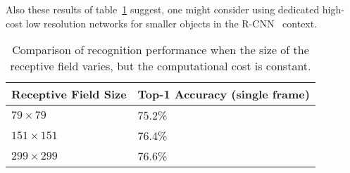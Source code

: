 \documentclass[10pt,twocolumn,letterpaper]{article}
\begin{document}
Also these results of table~\ref{lowrescmp} suggest, one might consider using
dedicated high-cost low resolution networks for smaller objects in the
R-CNN~\cite{girshick2014rcnn} context.

\begin{table}
{
 \begin{center}
   \begin{tabular}[H]{|l|l|}
   \hline
   {\bf Receptive Field Size} & {\bf Top-1 Accuracy (single frame)}\\
   \hline\hline
   $79\times 79$ & 75.2\% \\
   \hline
   $151\times 151$ & 76.4\% \\
   \hline
   $299\times 299$ & 76.6\% \\
   \hline
   \end{tabular}
 \end{center}
 }
\caption{Comparison of recognition performance when the size of the receptive
field varies, but the computational cost is constant.}
\label{lowrescmp}
\end{table}
\end{document}
